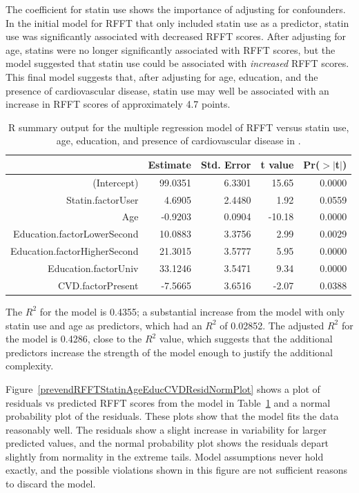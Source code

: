The coefficient for statin use shows the importance of adjusting for confounders.  In the initial model for RFFT that only included statin use as a predictor, statin use was significantly associated with decreased RFFT scores. After adjusting for age, statins were no longer significantly associated with RFFT scores, but the model suggested that statin use could be associated with \emph{increased} RFFT scores. This final model suggests that, after adjusting for age, education, and the presence of cardiovascular disease, statin use may well be associated with an increase in RFFT scores of approximately 4.7 points.
\begin{table}[ht]
\centering
\begin{tabular}{rrrrr}
  \hline
 & Estimate & Std. Error & t value & Pr($>$$|$t$|$) \\ 
  \hline
(Intercept) & 99.0351 & 6.3301 & 15.65 & 0.0000 \\ 
  Statin.factorUser & 4.6905 & 2.4480 & 1.92 & 0.0559 \\ 
  Age & -0.9203 & 0.0904 & -10.18 & 0.0000 \\ 
  Education.factorLowerSecond & 10.0883 & 3.3756 & 2.99 & 0.0029 \\ 
  Education.factorHigherSecond & 21.3015 & 3.5777 & 5.95 & 0.0000 \\ 
  Education.factorUniv & 33.1246 & 3.5471 & 9.34 & 0.0000 \\ 
  CVD.factorPresent & -7.5665 & 3.6516 & -2.07 & 0.0388 \\ 
   \hline
\end{tabular}
\caption{\textsf{R} summary output for the multiple regression model of RFFT versus statin use, age, education, and presence of cardiovascular disease in .} 
\label{prevendRFFTStatinAgeEducationCVD}
\end{table}

The $R^2$ for the model is 0.4355; a substantial increase from the model with only statin use and age as predictors, which had an $R^2$ of 0.02852. The adjusted $R^2$ for the model is 0.4286, close to the $R^2$ value, which suggests that the additional predictors increase the strength of the model enough to justify the additional complexity.

Figure~\ref{prevendRFFTStatinAgeEducCVDResidNormPlot} shows a plot of residuals vs predicted RFFT scores from the model in Table~\ref{prevendRFFTStatinAgeEducationCVD} and a normal probability plot of the residuals. These plots show that the model fits the data reasonably well. The residuals show a slight increase in variability for larger predicted values, and the normal probability plot shows the residuals depart slightly from normality in the extreme tails.  Model assumptions never hold exactly, and the possible violations shown in this figure are not sufficient reasons to discard the model.

